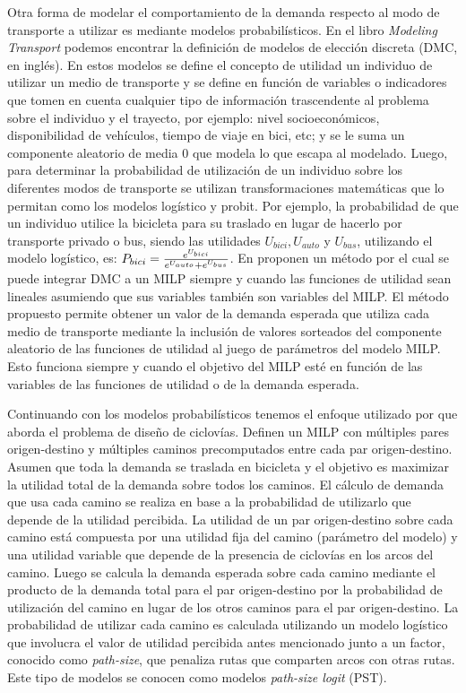 \documentclass{article}
\begin{document}
  Otra forma de modelar el comportamiento de la demanda respecto al modo de transporte a utilizar es mediante modelos probabilísticos. En el libro {\it Modeling Transport} \cite{ortuz2011} podemos encontrar la definición de modelos de elección discreta (DMC, en inglés). En estos modelos se define el concepto de utilidad un individuo de utilizar un medio de transporte y se define en función de variables o indicadores que tomen en cuenta cualquier tipo de información trascendente al problema sobre el individuo y el trayecto, por ejemplo: nivel socioeconómicos, disponibilidad de vehículos, tiempo de viaje en bici, etc; y se le suma un componente aleatorio de media 0 que modela lo que escapa al modelado. Luego, para determinar la probabilidad de utilización de un individuo sobre los diferentes modos de transporte se utilizan transformaciones matemáticas que lo permitan como los modelos logístico y probit. Por ejemplo, la probabilidad de que un individuo utilice la bicicleta para su traslado en lugar de hacerlo por transporte privado o bus, siendo las utilidades $U_{bici}, U_{auto}$ y $U_{bus}$, utilizando el modelo logístico, es: $P_{bici} = {e^{U_{bici}} \over {e^{U_{auto}} + e^{U_{bus}}}}$. En \cite{Pacheco2021} proponen un método por el cual se puede integrar DMC a un MILP siempre y cuando las funciones de utilidad sean lineales asumiendo que sus variables también son variables del MILP. El método propuesto permite obtener un valor de la demanda esperada que utiliza cada medio de transporte mediante la inclusión de valores sorteados del componente aleatorio de las funciones de utilidad al juego de parámetros del modelo MILP. Esto funciona siempre y cuando el objetivo del MILP esté en función de las variables de las funciones de utilidad o de la demanda esperada.

  Continuando con los modelos probabilísticos tenemos el enfoque utilizado por \cite{liu2019} que aborda el problema de diseño de ciclovías. Definen un MILP con múltiples pares origen-destino y múltiples caminos precomputados entre cada par origen-destino. Asumen que toda la demanda se traslada en bicicleta y el objetivo es maximizar la utilidad total de la demanda sobre todos los caminos. El cálculo de demanda que usa cada camino se realiza en base a la probabilidad de utilizarlo que depende de la utilidad percibida. La utilidad de un par origen-destino sobre cada camino está compuesta por una utilidad fija del camino (parámetro del modelo) y una utilidad variable que depende de la presencia de ciclovías en los arcos del camino. Luego se calcula la demanda esperada sobre cada camino mediante el producto de la demanda total para el par origen-destino por la probabilidad de utilización del camino en lugar de los otros caminos para el par origen-destino. La probabilidad de utilizar cada camino es calculada utilizando un modelo logístico que involucra el valor de utilidad percibida antes mencionado junto a un factor, conocido como {\it path-size}, que penaliza rutas que comparten arcos con otras rutas. Este tipo de modelos se conocen como modelos {\it path-size logit} (PST).
\end{document}
